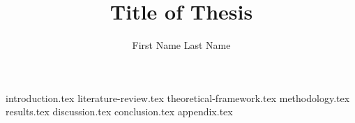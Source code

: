 \documentclass{master-thesis}
\title{Title of Thesis}
\author{First Name Last Name}
\begin{document}
\maketitle
\infosubmitted
\approvalpage
\disclaimerpage
\acknowledgments
\abstracts
\tableofcontentse
\tableoffigurres
\tableoftablles


{introduction.tex}
{literature-review.tex}
{theoretical-framework.tex}
{methodology.tex}
{results.tex}
{discussion.tex}
{conclusion.tex}
{appendix.tex}

\newpage
\printbibliography[heading=myheading]

\newpage
\backcover
\end{document}

